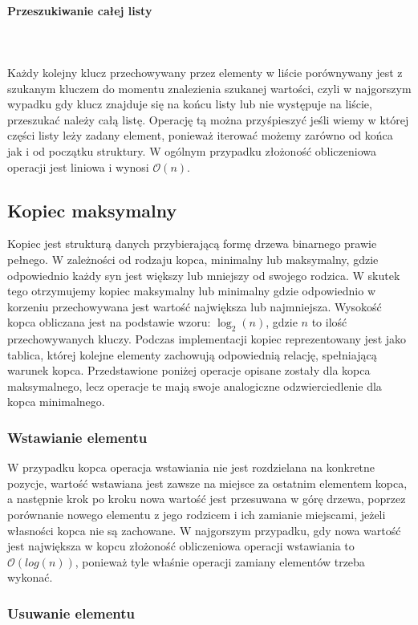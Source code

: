 \documentclass{article}
\newcommand{\myparagraph}[1]{\paragraph{#1}\mbox{}\\\\}
\begin{document}
\myparagraph{Przeszukiwanie całej listy} 
Każdy kolejny klucz przechowywany przez elementy w liście porównywany jest z szukanym kluczem do momentu znalezienia szukanej wartości, czyli w najgorszym wypadku gdy klucz znajduje się na końcu listy lub nie występuje na liście, przeszukać należy całą listę. Operację tą można przyśpieszyć jeśli wiemy w której części listy leży zadany element, ponieważ iterować możemy zarówno od końca jak i od początku struktury.
W ogólnym przypadku złożoność obliczeniowa operacji jest liniowa i wynosi $\mathcal{O}(n)$.

\subsection{Kopiec maksymalny}

Kopiec jest strukturą danych przybierającą formę drzewa binarnego prawie pełnego. W zależności od rodzaju kopca, minimalny lub maksymalny, gdzie odpowiednio każdy syn jest większy lub mniejszy od swojego rodzica. W skutek tego otrzymujemy kopiec maksymalny lub minimalny gdzie odpowiednio w korzeniu przechowywana jest wartość największa lub najmniejsza. Wysokość kopca obliczana jest na podstawie wzoru: $\log_{2}(n)$, gdzie $n$ to ilość przechowywanych kluczy. Podczas implementacji kopiec reprezentowany jest jako tablica, której kolejne elementy zachowują odpowiednią relację, spełniającą warunek kopca. Przedstawione poniżej operacje opisane zostały dla kopca maksymalnego, lecz operacje te mają swoje analogiczne odzwierciedlenie dla kopca minimalnego.


\subsubsection{Wstawianie elementu} 
 
W przypadku kopca operacja wstawiania nie jest rozdzielana na konkretne pozycje, wartość wstawiana jest zawsze na miejsce za ostatnim elementem kopca, a następnie krok po kroku nowa wartość jest przesuwana w górę drzewa, poprzez porównanie nowego elementu z jego rodzicem i ich zamianie miejscami, jeżeli własności kopca nie są zachowane. W najgorszym przypadku, gdy nowa wartość jest największa w kopcu złożoność obliczeniowa operacji wstawiania to $\mathcal{O}(log(n))$, ponieważ tyle właśnie operacji zamiany elementów trzeba wykonać.

\subsubsection{Usuwanie elementu} 
\end{document}
